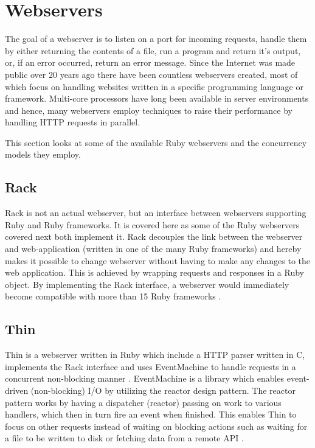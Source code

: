 \section{Webservers}
\label{webservers}

The goal of a webserver is to listen on a port for incoming requests, handle them
by either returning the contents of a file, run a program and return it's
output, or, if an error occurred, return an error message. Since the Internet was
made public over 20 years ago there have been countless webservers created, most
of which focus on handling websites written in a specific programming language
or framework. Multi-core processors have long been available in server
environments and hence, many webservers employ techniques to raise their
performance by handling HTTP requests in parallel.

This section looks at some of the available Ruby webservers and the
concurrency models they employ.

\subsection{Rack}
Rack is not an actual webserver, but an interface between webservers
supporting Ruby and Ruby frameworks. It is covered here as some of the Ruby
webservers covered next both implement it. Rack decouples the link between the
webserver and web-application (written in one of the many Ruby frameworks) and
hereby makes it possible to change webserver without having to make any
changes to the web application. This is achieved by wrapping requests and
responses in a Ruby object. By implementing the Rack interface, a webserver
would immediately become compatible with more than 15 Ruby frameworks
\cite{rackspec}.

\subsection{Thin}
Thin is a webserver written in Ruby which include a HTTP parser written in C,
implements the Rack interface and uses EventMachine to handle requests in a
concurrent non-blocking manner \cite{thin}. EventMachine is a library which enables
event-driven (non-blocking) I/O by utilizing the reactor design pattern. The
reactor pattern works by having a dispatcher (reactor) passing on work to
various handlers, which then in turn fire an event when finished. This enables
Thin to focus on other requests instead of waiting on blocking actions such as
waiting for a file to be written to disk or fetching data from a remote API
\cite{reactor}.


